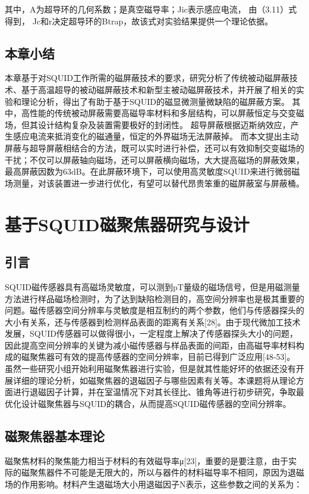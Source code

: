 \documentclass[a4paper,12pt，twoside]{ctexart}
\begin{document}
	 其中，A为超导环的几何系数；是真空磁导率；Jic表示感应电流，
	 由（3.11）式得到， Jc和r决定超导环的Btrap，故该式对实验结果提供一个理论依据。
	 
	 
	 \subsection{本章小结}
	 本章基于对SQUID工作所需的磁屏蔽技术的要求，研究分析了传统被动磁屏蔽技术、基于高温超导的被动磁屏蔽技术和新型主被动磁屏蔽技术，并开展了相关的实验和理论分析，得出了有助于基于SQUID的磁显微测量微缺陷的磁屏蔽方案。
	 其中，高性能的传统被动屏蔽需要高磁导率材料和多层结构，可以屏蔽恒定与交变磁场，但其设计结构复杂及装置需要极好的封闭性。
	 超导屏蔽根据迈斯纳效应，产生感应电流来抵消变化的磁通量，恒定的外界磁场无法屏蔽掉。
	 而本文提出主动屏蔽与超导屏蔽相结合的方法，既可以实时进行补偿，还可以有效抑制交变磁场的干扰；不仅可以屏蔽轴向磁场，还可以屏蔽横向磁场，大大提高磁场的屏蔽效果，最高屏蔽因数为63dB。在此屏蔽环境下，可以使用高灵敏度SQUID来进行微弱磁场测量，对该装置进一步进行优化，有望可以替代昂贵笨重的磁屏蔽室与屏蔽桶。 
	 
	 
	\newpage
	\section{基于SQUID磁聚焦器研究与设计}
	
	
	\subsection{引言}
	SQUID磁传感器具有高磁场灵敏度，可以测到pT量级的磁场信号，但是用磁测量方法进行样品磁场检测时，为了达到缺陷检测目的，高空间分辨率也是极其重要的问题。磁传感器空间分辨率与灵敏度是相互制约的两个参数，他们与传感器探头的大小有关系，还与传感器到检测样品表面的距离有关系[28]。由于现代微加工技术发展，SQUID传感器可以做得很小，一定程度上解决了传感器探头大小的问题，因此提高空间分辨率的关键为减小磁传感器与样品表面的间距，由高磁导率材料构成的磁聚焦器可有效的提高传感器的空间分辨率，目前已得到广泛应用[48-53]。
	虽然一些研究小组开始利用磁聚焦器进行实验，但是就其性能好坏的依据还没有开展详细的理论分析，如磁聚焦器的退磁因子与哪些因素有关等。本课题将从理论方面进行退磁因子计算，并在室温情况下对其长径比、锥角等进行初步研究，争取最优化设计磁聚焦器与SQUID的耦合，从而提高SQUID磁传感器的空间分辨率。
	
	
	\subsection{磁聚焦器基本理论}
	磁聚焦材料的聚焦能力相当于材料的有效磁导率μ[23]，重要的是要注意，由于实际的磁聚焦器件不可能是无限大的，所以与器件的材料磁导率不相同，原因为退磁场的作用影响。材料产生退磁场大小用退磁因子N表示，这些参数之间的关系为：\par
	
\end{document}
